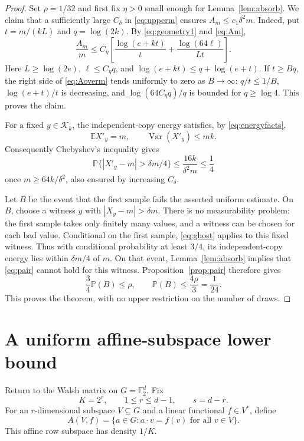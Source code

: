 \documentclass[11pt]{article}
\theoremstyle{remark}
\newcommand{\E}{\mathbb E}
\newcommand{\Prob}{\mathbb P}
\newcommand{\F}{\mathbb F}
\newcommand{\1}{\mathbf 1}
\newcommand{\K}{\mathcal K}
\DeclareMathOperator{\Var}{Var}
\begin{document}
\begin{proof}
Set $\rho=1/32$ and first fix $\eta>0$ small enough for
Lemma~\ref{lem:absorb}. We claim that a sufficiently large $C_\delta$ in
\eqref{eq:upperm} ensures $A_m\leq c_1\delta^2m$.
Indeed, put $t=m/(kL)$ and $q=\log(2k)$. By
\eqref{eq:geometry1} and \eqref{eq:Am},
\begin{equation}\label{eq:Aoverm}
 \frac{A_m}{m}\leq C_\eta
 \left[\frac{\log(e+kt)}t+\frac{\log(64\ell)}{Lt}\right].
\end{equation}
Here $L\geq\log(2e)$, $\ell\leq C_\eta q$, and
$\log(e+kt)\leq q+\log(e+t)$. If $t\geq Bq$, the right side of
\eqref{eq:Aoverm} tends uniformly to zero as $B\to\infty$:
$q/t\leq1/B$, $\log(e+t)/t$ is decreasing, and
$\log(64C_\eta q)/q$ is bounded for $q\geq\log4$.
This proves the claim.

For a fixed $y\in\K_k$, the independent-copy energy satisfies, by
\eqref{eq:energyfacts},
\[
 \E X'_y=m,\qquad \Var(X'_y)\leq mk.
\]
Consequently Chebyshev's inequality gives
\begin{equation}\label{eq:ghost}
 \Prob\{|X'_y-m|>\delta m/4\}
 \leq\frac{16k}{\delta^2m}\leq\frac14
\end{equation}
once $m\geq64k/\delta^2$, also ensured by increasing $C_\delta$.

Let $B$ be the event that the first sample fails the asserted uniform
estimate. On $B$, choose a witness $y$ with $|X_y-m|>\delta m$.
There is no measurability problem: the first sample takes only finitely
many values, and a witness can be chosen for each bad value. Conditional
on the first sample, \eqref{eq:ghost} applies to this fixed witness.
Thus with conditional probability at least $3/4$, its independent-copy
energy lies within $\delta m/4$ of $m$. On that event,
Lemma~\ref{lem:absorb} implies that \eqref{eq:pair} cannot hold for this
witness. Proposition~\ref{prop:pair} therefore gives
\[
 \frac34\Prob(B)\leq\rho,\qquad
 \Prob(B)\leq\frac{4\rho}{3}=\frac1{24}.
\]
This proves the theorem, with no upper restriction on the number of draws.
\end{proof}

\section{A uniform affine-subspace lower bound}

Return to the Walsh matrix on $G=\F_2^d$. Fix
\begin{equation}\label{eq:dyadicpars}
 K=2^r,\qquad 1\leq r\leq d-1,\qquad s=d-r.
\end{equation}
For an $r$-dimensional subspace $V\subseteq G$ and a linear functional
$f\in V^*$, define
\[
 A(V,f)=\{a\in G:a\cdot v=f(v)\text{ for all }v\in V\}.
\]
This affine row subspace has density $1/K$.
\end{document}
